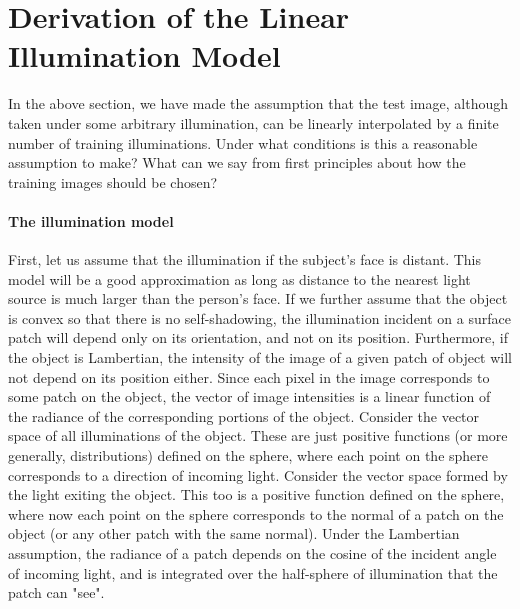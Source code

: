 \section{Derivation of the Linear Illumination Model}
\label{sec:appendix_illumination}


In the above section, we have
made the assumption that the test image, although taken under some arbitrary
illumination, can be linearly interpolated by a finite number of training
illuminations.  Under what conditions is this a reasonable assumption to make?
What can we say from first principles about how the training images should be
chosen?  

\paragraph{The illumination model}
%
First, let us assume that the illumination if the subject's face is distant.
This model will be a good approximation as long as distance to the nearest
light source is much larger than the person's face.  If we further assume that
the object is convex so that there is no self-shadowing, the illumination
incident on a surface patch will depend only on its orientation, and not on its
position.  Furthermore, if the object is Lambertian, the intensity of the image
of a given patch of object will not depend on its position either.  Since each
pixel in the image corresponds to some patch on the object, the vector of image
intensities is a linear function of the radiance of the corresponding portions
of the object.  Consider the vector space of all illuminations of the object.
These are just positive functions (or more generally, distributions) defined on
the sphere, where each point on the sphere corresponds to a direction of
incoming light.  Consider the vector space formed by the light exiting the
object.  This too is a positive function defined on the sphere, where now each
point on the sphere corresponds to the normal of a patch on the object (or any
other patch with the same normal).  Under the Lambertian assumption, the
radiance of a patch depends on the cosine of the incident angle of incoming
light, and is integrated over the half-sphere of illumination that the patch
can "see".


